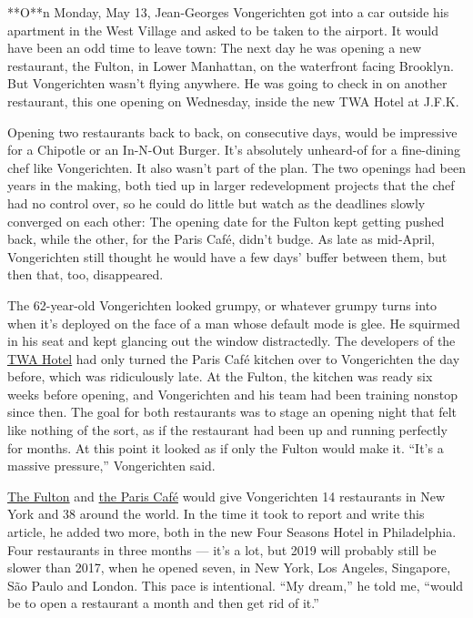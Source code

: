 **O**n Monday, May 13, Jean-Georges Vongerichten got into a car outside
his apartment in the West Village and asked to be taken to the airport.
It would have been an odd time to leave town: The next day he was
opening a new restaurant, the Fulton, in Lower Manhattan, on the
waterfront facing Brooklyn. But Vongerichten wasn't flying anywhere. He
was going to check in on another restaurant, this one opening on
Wednesday, inside the new TWA Hotel at J.F.K.

Opening two restaurants back to back, on consecutive days, would be
impressive for a Chipotle or an In-N-Out Burger. It's absolutely
unheard-of for a fine-dining chef like Vongerichten. It also wasn't part
of the plan. The two openings had been years in the making, both tied up
in larger redevelopment projects that the chef had no control over, so
he could do little but watch as the deadlines slowly converged on each
other: The opening date for the Fulton kept getting pushed back, while
the other, for the Paris Café, didn't budge. As late as mid-April,
Vongerichten still thought he would have a few days' buffer between
them, but then that, too, disappeared.

The 62-year-old Vongerichten looked grumpy, or whatever grumpy turns
into when it's deployed on the face of a man whose default mode is glee.
He squirmed in his seat and kept glancing out the window distractedly.
The developers of the
\href{https://www.nytimes3xbfgragh.onion/2019/07/01/travel/twa-hotel-jfk.html}{TWA
Hotel} had only turned the Paris Café kitchen over to Vongerichten the
day before, which was ridiculously late. At the Fulton, the kitchen was
ready six weeks before opening, and Vongerichten and his team had been
training nonstop since then. The goal for both restaurants was to stage
an opening night that felt like nothing of the sort, as if the
restaurant had been up and running perfectly for months. At this point
it looked as if only the Fulton would make it. ``It's a massive
pressure,'' Vongerichten said.

\href{https://www.nytimes3xbfgragh.onion/2019/07/30/dining/the-fulton-review-pete-wells-jean-georges.html}{The
Fulton} and
\href{https://www.nytimes3xbfgragh.onion/2019/05/15/dining/twa-terminal-restaurants-jean-georges-vongerichten.html}{the
Paris Café} would give Vongerichten 14 restaurants in New York and 38
around the world. In the time it took to report and write this article,
he added two more, both in the new Four Seasons Hotel in Philadelphia.
Four restaurants in three months --- it's a lot, but 2019 will probably
still be slower than 2017, when he opened seven, in New York, Los
Angeles, Singapore, São Paulo and London. This pace is intentional. ``My
dream,'' he told me, ``would be to open a restaurant a month and then
get rid of it.''

